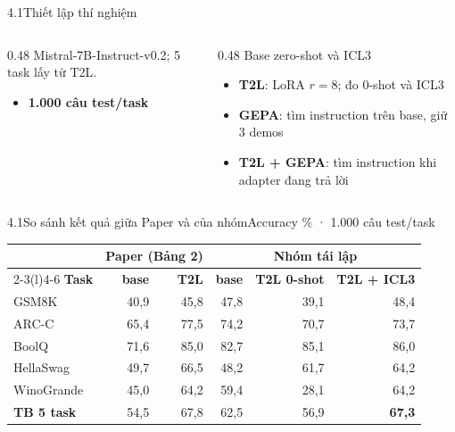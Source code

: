 \begin{frame}{4.1\quad Thiết lập thí nghiệm}
  \footnotesize
  \begin{columns}[T,onlytextwidth]
    \begin{column}{0.48\textwidth}
        {Mistral-7B-Instruct-v0.2; 5 task lấy từ T2L.}
        {\scriptsize\begin{itemize}\tightlist
          \item \textbf{1.000 câu test/task}
        \end{itemize}}
    \end{column}
    \begin{column}{0.48\textwidth}
        {Base zero-shot và ICL3}
        {\scriptsize\begin{itemize}\tightlist
          \item \textbf{T2L}: LoRA $r{=}8$; đo 0-shot và ICL3
          \item \textbf{GEPA}: tìm instruction trên base, giữ 3 demos
          \item \textbf{T2L + GEPA}: tìm instruction khi adapter đang trả lời
        \end{itemize}}
    \end{column}
  \end{columns}
\end{frame}

\begin{frame}{4.1\quad So sánh kết quả giữa Paper và của nhóm}{Accuracy \% · 1.000 câu test/task}
  \centering\scriptsize
  \renewcommand{\arraystretch}{1.15}
  \setlength{\tabcolsep}{4.5pt}
  \begin{tabular}{@{}l rrrrr@{}}
    \toprule
    & \multicolumn{2}{c}{\textbf{Paper (Bảng 2)}} & \multicolumn{3}{c}{\textbf{Nhóm tái lập}}\\
    \cmidrule(r){2-3}\cmidrule(l){4-6}
    \textbf{Task} & \textbf{base} & \textbf{T2L} & \textbf{base} & \textbf{T2L 0-shot} & \textbf{T2L + ICL3}\\
    \midrule
    GSM8K      & 40,9 & 45,8 & 47,8 & 39,1 & 48,4\\
    ARC-C      & 65,4 & 77,5 & 74,2 & 70,7 & 73,7\\
    BoolQ      & 71,6 & 85,0 & 82,7 & 85,1 & 86,0\\
    HellaSwag  & 49,7 & 66,5 & 48,2 & 61,7 & 64,2\\
    WinoGrande & 45,0 & 64,2 & 59,4 & 28,1 & 64,2\\
    \midrule
    \textbf{TB 5 task} & 54,5 & 67,8 & 62,5 & 56,9 & \textbf{67,3}\\
    \bottomrule
  \end{tabular}
\end{frame}


